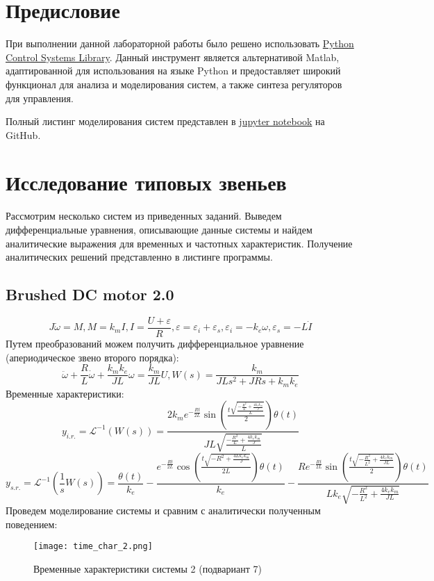 \tableofcontents
\section*{Предисловие}
При выполнении данной лабораторной работы было решено использовать 
\href{https://python-control.readthedocs.io/en/0.9.4/}{Python Control Systems Library}.
Данный инструмент является альтернативой Matlab, адаптированной для использования на 
языке Python и предоставляет широкий функционал для анализа и моделирования систем,
а также синтеза регуляторов для управления.

Полный листинг моделирования систем представлен в \href{https://github.com/diuzhevVlad/control-theory-itmo-fall-2023/blob/main/Lab5/Lab5.ipynb}{jupyter notebook} на GitHub.

\pagebreak

\section{Исследование типовых звеньев}
Рассмотрим несколько систем из приведенных заданий. Выведем дифференциальные уравнения, описывающие данные 
системы и найдем аналитические выражения для временных и частотных характеристик. Получение аналитических решений представленно
в листинге программы.
\subsection*{Brushed DC motor 2.0}
\begin{equation}
    J \dot{\omega} = M, M = k_m I, I = \frac{U+\varepsilon}{R}, \varepsilon = \varepsilon_i + \varepsilon_s, \varepsilon_i=-k_e \omega, \varepsilon_s=-L\dot{I}
\end{equation}
Путем преобразований можем получить дифференциальное уравнение (апериодическое звено второго порядка):
\begin{equation*}
    \ddot{\omega} + \frac{R}{L}\dot{\omega}+\frac{k_mk_e}{JL}\omega = \frac{k_m}{JL}U, W(s)=\frac{k_m}{JLs^2 + JRs + k_mk_e}
\end{equation*}
Временные характеристики:
\begin{equation*}
    y_{i.r.}=\mathcal{L}^{-1}(W(s)) = \frac{2 k_{m} e^{- \frac{R t}{2 L}} \sin{(\frac{t \sqrt{\frac{- \frac{R^{2}}{L} + \frac{4 k_{e} k_{m}}{J}}{L}}}{2} )} \theta(t)}{J L \sqrt{\frac{- \frac{R^{2}}{L} + \frac{4 k_{e} k_{m}}{J}}{L}}}
\end{equation*}
\begin{equation*}
    y_{s.r.}=\mathcal{L}^{-1}(\frac{1}{s}W(s)) = \frac{\theta(t)}{k_{e}} - \frac{e^{- \frac{R t}{2 L}} \cos{(\frac{t \sqrt{- R^{2} + \frac{4 L k_{e} k_{m}}{J}}}{2 L} )} \theta(t)}{k_{e}} - \frac{R e^{- \frac{R t}{2 L}} \sin{(\frac{t \sqrt{- \frac{R^{2}}{L^{2}} + \frac{4 k_{e} k_{m}}{J L}}}{2} )} \theta(t)}{L k_{e} \sqrt{- \frac{R^{2}}{L^{2}} + \frac{4 k_{e} k_{m}}{J L}}}
\end{equation*}
Проведем моделирование системы и сравним с аналитически полученным поведением:
\begin{figure}[h]
    \centering
    \texttt{[image: time\_char\_2.png]}
    \caption{\label{fig:The-caption-1}Временные характеристики системы 2 (подвариант 7)}
\end{figure}


